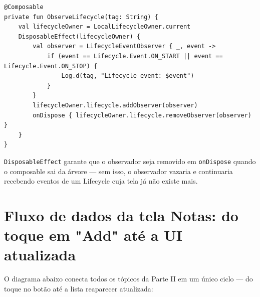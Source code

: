 \documentclass[11pt,a4paper]{article}
\begin{document}
\begin{lstlisting}[caption={Observando o Lifecycle da Activity a partir de um Composable}, label=lst:lifecycle-compose]
@Composable
private fun ObserveLifecycle(tag: String) {
    val lifecycleOwner = LocalLifecycleOwner.current
    DisposableEffect(lifecycleOwner) {
        val observer = LifecycleEventObserver { _, event ->
            if (event == Lifecycle.Event.ON_START || event == Lifecycle.Event.ON_STOP) {
                Log.d(tag, "Lifecycle event: $event")
            }
        }
        lifecycleOwner.lifecycle.addObserver(observer)
        onDispose { lifecycleOwner.lifecycle.removeObserver(observer) }
    }
}
\end{lstlisting}

\texttt{DisposableEffect} garante que o observador seja removido em
\texttt{onDispose} quando o composable sai da árvore — sem isso, o
observador vazaria e continuaria recebendo eventos de um Lifecycle cuja
tela já não existe mais.

\section{Fluxo de dados da tela Notas: do toque em "Add" até a UI atualizada}

O diagrama abaixo conecta todos os tópicos da Parte II em um único
ciclo — do toque no botão até a lista reaparecer atualizada:

\begin{center}
\end{center}
\end{document}
